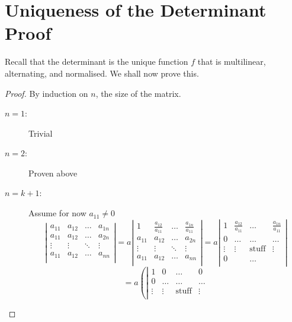 \documentclass{article}
\theoremstyle{definition}
\begin{document}
\section{Uniqueness of the Determinant Proof}
Recall that the determinant is the unique function $f$ that is multilinear, alternating, and normalised. We shall now prove this.
\begin{proof}
	By induction on $n$, the size of the matrix.
	\begin{description}
		\item[$n=1$:] Trivial
		\item[$n=2$:] Proven above
		\item[$n=k+1$:] Assume for now $a_{11}\neq 0$
			\begin{equation*}
				\left|
					\begin{matrix}
						a_{11} & a_{12} & \dots & a_{1n} \\
						a_{11} & a_{12} & \dots & a_{2n} \\
						\vdots & \vdots & \ddots & \vdots \\
						a_{11} & a_{12} & \dots & a_{nn} \\
					\end{matrix}
				\right| = a\left|
					\begin{matrix}
						1 & \frac{a_{12}}{a_{11}} & \dots & \frac{a_{1n}}{a_{11}} \\
						a_{11} & a_{12} & \dots & a_{2n} \\
						\vdots & \vdots & \ddots & \vdots \\
						a_{11} & a_{12} & \dots & a_{nn} \\
					\end{matrix}
				\right| = a\left|
					\begin{matrix}
						1 & \frac{a_{12}}{a_{11}} & \dots & \frac{a_{1n}}{a_{11}} \\
						0 & \dots & \dots & \dots \\
						\vdots & \vdots & \text{stuff} & \vdots \\
						0 &  & \dots &  \\
					\end{matrix}
				\right|
			\end{equation*}
			\begin{equation*}
				= a\left(\left|
					\begin{matrix}
						1 & 0 & \dots & 0 \\
						0 & \dots & \dots & \dots \\
						\vdots & \vdots & \text{stuff} & \vdots \\

\end{matrix}
\end{equation*}
\end{description}
\end{proof}
\end{document}
